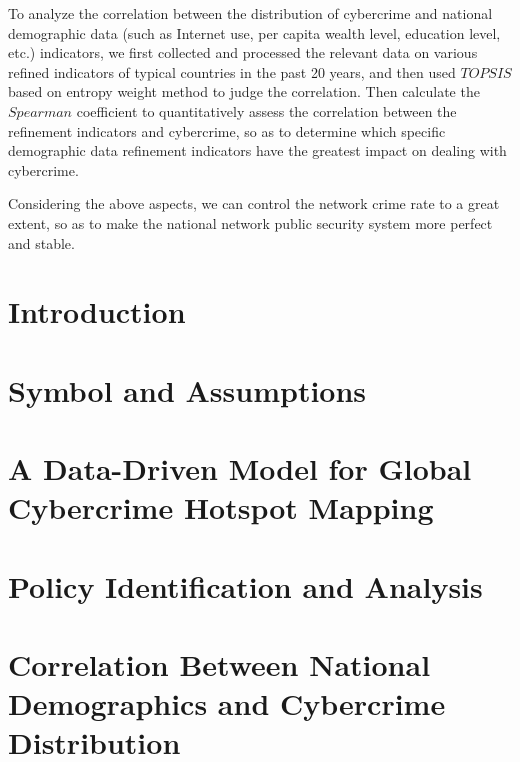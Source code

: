 \documentclass[12pt]{article}
\begin{document}
\begin{adjustwidth}{2em}{2em}
	To analyze the correlation between the distribution of cybercrime and national demographic data
	(such as Internet use, per capita wealth level, education level, etc.) indicators,
	we first collected and processed the relevant data on various refined indicators of typical countries in the past 20 years,
	and then used $TOPSIS$ based on entropy weight method to judge the correlation.
	Then calculate the $Spearman$ coefficient to quantitatively assess the correlation between the refinement indicators and cybercrime,
	so as to determine which specific demographic data refinement indicators have the greatest impact on dealing with cybercrime.

	Considering the above aspects, we can control the network crime rate to a great extent,
	so as to make the national network public security system more perfect and stable.
\end{adjustwidth}

\newpage
\tableofcontents
\newpage

\section{Introduction}\label{sec:introduction}

\section{Symbol and Assumptions}\label{sec:symbol-and-assumptions}

\section{A Data-Driven Model for Global Cybercrime Hotspot Mapping}
\label{sec:a-data-driven-model-for-global-cybercrime-hotspot-mapping}

\section{Policy Identification and Analysis}\label{sec:policy-identification-and-analysis}

\section{Correlation Between National Demographics and Cybercrime Distribution}
\label{sec:correlation-between-national-demographics-and-cybercrime-distribution}
\end{document}
